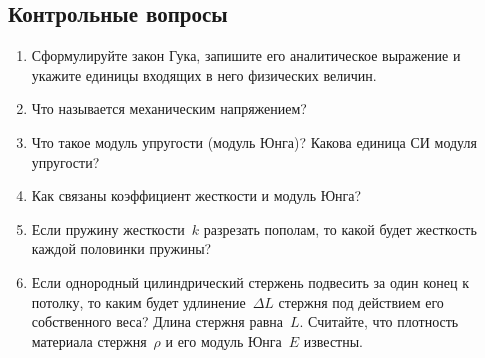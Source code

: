 \documentclass[a4paper, 12pt]{extarticle}
\begin{document}
\subsection{Контрольные вопросы}
\begin{enumerate}
\item Сформулируйте закон Гука, запишите его аналитическое выражение и укажите единицы входящих в него физических величин. 
\item Что называется механическим напряжением?
\item Что такое модуль упругости (модуль Юнга)? Какова единица СИ модуля упругости?
\item Как связаны коэффициент жесткости и модуль Юнга?
\item Если пружину жесткости~$k$ разрезать пополам, то какой будет жесткость каждой половинки пружины? 
\item Если однородный цилиндрический стержень подвесить за один конец к потолку, то каким будет удлинение~$\Delta L$ стержня под действием его собственного веса? Длина стержня равна~$L$. Считайте, что плотность материала стержня~$\rho$ и его модуль Юнга~$E$ известны. 
\end{enumerate}
\end{document}
